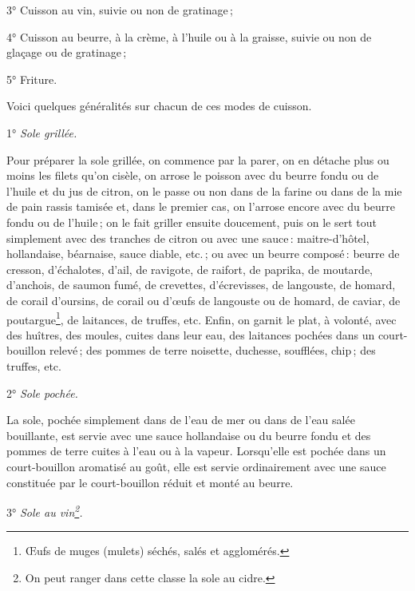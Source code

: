3° Cuisson au vin, suivie ou non de gratinage ;

4° Cuisson au beurre, à la crème, à l'huile ou à la graisse, suivie ou non de
glaçage ou de gratinage ;

5° Friture.

Voici quelques généralités sur chacun de ces modes de cuisson.

\begin{center}
1° \textit{Sole grillée.}
\end{center}
\label{pg0355} \hypertarget{p0355}{}

Pour préparer la sole grillée, on commence par la parer, on en détache plus ou
moins les filets qu'on cisèle, on arrose le poisson avec du beurre fondu ou de
l'huile et du jus de citron, on le passe ou non dans de la farine ou dans de la
mie de pain rassis tamisée et, dans le premier cas, on l'arrose encore avec du
beurre fondu ou de l'huile ; on le fait griller ensuite doucement, puis on le
sert tout simplement avec des tranches de citron ou avec une sauce :
maitre-d'hôtel, hollandaise, béarnaise, sauce diable, etc. ; 
ou avec un beurre composé : beurre de cresson, d'échalotes, d'ail, de
ravigote, de raifort, de paprika, de moutarde, d’anchois, de saumon fumé, de
crevettes, d'écrevisses, de langouste, de homard, de corail d'oursins, de
corail ou d'œufs de langouste ou de homard, de caviar, de
poutargue\footnote{Œufs de muges (mulets) séchés, salés et agglomérés.}, de
laitances, de truffes, etc.
Enfin, on garnit le
plat, à volonté, avec des huîtres, des moules, cuites dans leur eau, des
laitances pochées dans un court-bouillon relevé ; des pommes de terre noisette,
duchesse, soufflées, chip ; des truffes, etc.

\begin{center}
2° \textit{Sole pochée.}
\end{center}

La sole, pochée simplement dans de l'eau de mer ou dans de l'eau salée
bouillante, est servie avec une sauce hollandaise ou du beurre fondu et des
pommes de terre cuites à l'eau ou à la vapeur. Lorsqu'elle est pochée dans un
court-bouillon aromatisé au goût, elle est servie ordinairement avec une sauce
constituée par le court-bouillon réduit et monté au beurre.

\begin{center}
3° \textit{Sole au vin\footnote{ On peut ranger dans cette classe la sole au cidre.}.}
\end{center}

